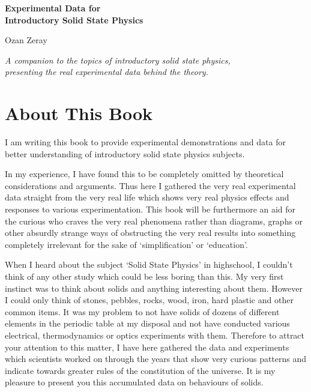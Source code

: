 \documentclass[12pt, oneside]{book}
\begin{document}
\begin{titlepage}
  \centering
  \vspace*{4cm}
  {\Huge\bfseries Experimental Data for\\[0.3cm]
   Introductory Solid State Physics \par}
  \vspace{2cm}
  {\Large Ozan Zeray\par}
  \vfill
  {\large\itshape A companion to the topics of introductory solid state physics,\\
  presenting the real experimental data behind the theory.\par}
  \vfill
\end{titlepage}

\chapter*{About This Book}

I am writing this book to provide experimental demonstrations and
data for better understanding of introductory solid state physics subjects.

In my experience, I have found this to be completely omitted by theoretical
considerations and arguments. Thus here I gathered the very real experimental
data straight from the very real life which shows very real physics effects and responses
to various experimentation. This book will be furthermore an aid for the curious who craves
the very real phenomena rather than diagrams, graphs or other absurdly strange ways of
obstructing the very real results into something completely irrelevant for the sake of
`simplification' or `education'.

When I heard about the subject `Solid State Physics' in highschool, I couldn't think of any other
study which could be less boring than this. My very first instinct was to think about solids
and anything interesting about them. However I could only think of stones, pebbles, rocks, wood,
iron, hard plastic and other common items. It was my problem to not have solids of dozens of different
elements in the periodic table at my disposal and not have conducted various electrical, thermodynamics or optics
experiments with them. Therefore to attract your attention to this matter, I have here
gathered the data and experiments which scientists worked on through the years that show
very curious patterns and indicate towards greater rules of the constitution of the universe.
It is my pleasure to present you this accumulated data on behaviours of solids.
\end{document}
